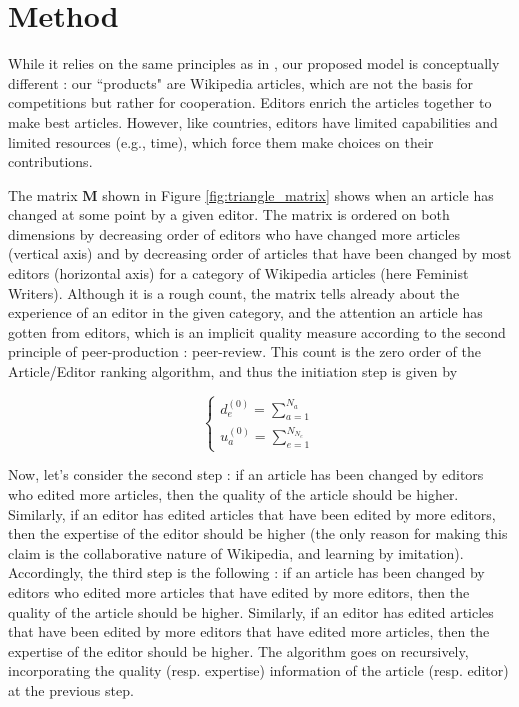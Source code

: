 \section{Method}
While it relies on the same principles as in \cite{caldarelli2012network}, our proposed model is conceptually different : our ``products" are Wikipedia articles, which are not the basis for competitions but rather for cooperation. Editors enrich the articles together to make best articles. However, like countries, editors have limited capabilities and limited resources (e.g., time), which force them make choices on their contributions.

The matrix $\mathbf{M}$ shown in Figure \ref{fig:triangle_matrix} shows when an article has changed at some point by a given editor. The matrix is ordered on both dimensions by decreasing order of editors who have changed more articles (vertical axis) and by decreasing order of articles that have been changed by most editors (horizontal axis) for a category of Wikipedia articles (here Feminist Writers). Although it is a rough count, the matrix tells already about the experience of an editor in the given category, and the attention an article has gotten from editors, which is an implicit quality measure according to the second principle of peer-production : peer-review. This count is the zero order of the Article/Editor ranking algorithm, and thus the initiation step is given by 

\begin{equation}
\begin{cases}
 d_{e}^{(0)} = \sum_{a=1}^{N_{a}}\\
 u_{a}^{(0)} = \sum_{e=1}^{N_{N_{e}}}
\end{cases}
\end{equation}

Now, let's consider the second step :  if an article has been changed by editors who edited more articles, then the quality of the article should be higher. Similarly, if an editor has edited articles that have been edited by more editors, then the expertise of the editor should be higher (the only reason for making this claim is the collaborative nature of Wikipedia, and learning by imitation). Accordingly, the third step is the following : if an article has been changed by editors who edited more articles that have edited by more editors, then the quality of the article should be higher. Similarly, if an editor has edited articles that have been edited by more editors that have edited more articles, then the expertise of the editor should be higher. The algorithm goes on recursively, incorporating the quality (resp. expertise) information of the article (resp. editor) at the previous step. 

